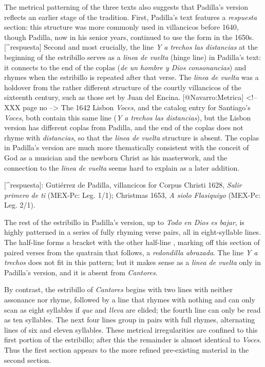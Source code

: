 The metrical patterning of the three texts also suggests that Padilla's version
reflects an earlier stage of the tradition.
First, Padilla's text features a \emph{respuesta} section: this structure was more
commonly used in villancicos before 1640, though Padilla, now in his senior
years, continued to use the form in the 1650s.[^respuesta]
Second and most crucially, the line \emph{Y a trechos las distancias} at the
beginning of the estribillo serves as a \emph{linea de vuelta} (hinge line) in
Padilla's text: it connects to the end of the coplas (\emph{de un hombre y Dios
consonancias}) and rhymes when the estribillo is repeated after that verse.
The \emph{linea de vuelta} was a holdover from the rather different structure of the
courtly villancicos of the sixteenth century, such as those set by Juan del
Encina.
[@Navarro:Metrica] <!-- XXX page no -->
The 1642 Lisbon \emph{Voces}, and the catalog entry for Santiago's \emph{Voces}, both
contain this same line (\emph{Y a trechos las distancias}), but the Lisbon version
has different coplas from Padilla, and the end of the coplas does not rhyme with
\emph{distancias}, so that the \emph{linea de vuelta} structure is absent.
The  coplas in Padilla's version are much more thematically consistent with
the conceit of God as a musician and the newborn Christ as his masterwork, and
the connection to the \emph{linea de vuelta} seems hard to explain as a later
addition.

[^respuesta]:
Gutiérrez de Padilla, villancicos for Corpus Christi 1628, \emph{Salir primero de ti}
(MEX-Pc: Leg. 1/1); Christmas 1653, \emph{A siolo Flasiquiyo} (MEX-Pc: Leg. 2/1).

The rest of the estribillo in Padilla's version, up to \emph{Todo en Dios es bajar},
is highly patterned in a series of fully rhyming verse pairs, all in
eight-syllable lines.
The half-line  forms a bracket with the other half-line , marking off this section of paired verses from the quatrain that
follows, a \emph{redondilla abrazada}.
The line \emph{Y a trechos} does not fit in this pattern; but it makes sense as a
\emph{linea de vuelta} only in Padilla's version, and it is absent from \emph{Cantores}.

By contrast, the estribillo of \emph{Cantores} begins with two lines with neither
assonance nor rhyme, followed by a line that rhymes with nothing and can only
scan as eight syllables if \emph{que} and \emph{lleva} are elided; the fourth line can
only be read as ten syllables.
The next four lines group in pairs with full rhymes, alternating lines of six
and eleven syllables.
These metrical irregularities are confined to this first portion of the
estribillo; after this the remainder is almost identical to \emph{Voces}.
Thus the first section appears  to the more refined pre-existing
material in the second section.

